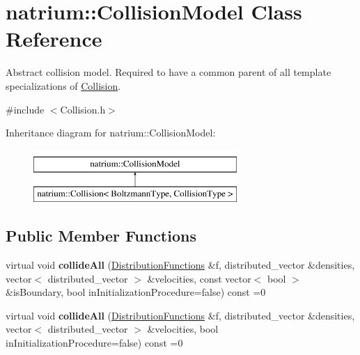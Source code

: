 \hypertarget{classnatrium_1_1CollisionModel}{\section{natrium\-:\-:Collision\-Model Class Reference}
\label{classnatrium_1_1CollisionModel}
}


Abstract collision model. Required to have a common parent of all template specializations of \hyperlink{classnatrium_1_1Collision}{Collision}.  




{\ttfamily \#include $<$Collision.\-h$>$}

Inheritance diagram for natrium\-:\-:Collision\-Model\-:\begin{figure}[H]
\begin{center}
\leavevmode
\includegraphics[height=2.000000cm]{classnatrium_1_1CollisionModel}
\end{center}
\end{figure}
\subsection*{Public Member Functions}
\begin{DoxyCompactItemize}
\item 
\hypertarget{classnatrium_1_1CollisionModel_a97aeb4fa9513c45785fe9153ef062062}{virtual void {\bfseries collide\-All} (\hyperlink{classnatrium_1_1DistributionFunctions}{Distribution\-Functions} \&f, distributed\-\_\-vector \&densities, vector$<$ distributed\-\_\-vector $>$ \&velocities, const vector$<$ bool $>$ \&is\-Boundary, bool in\-Initialization\-Procedure=false) const =0}\label{classnatrium_1_1CollisionModel_a97aeb4fa9513c45785fe9153ef062062}

\item 
\hypertarget{classnatrium_1_1CollisionModel_ac7443a320a4badab46185915b78d002f}{virtual void {\bfseries collide\-All} (\hyperlink{classnatrium_1_1DistributionFunctions}{Distribution\-Functions} \&f, distributed\-\_\-vector \&densities, vector$<$ distributed\-\_\-vector $>$ \&velocities, bool in\-Initialization\-Procedure=false) const =0}\label{classnatrium_1_1CollisionModel_ac7443a320a4badab46185915b78d002f}

\end{DoxyCompactItemize}


